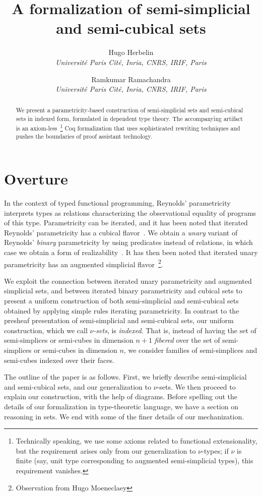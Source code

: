 \documentclass[10pt]{art.cls/art}
\title{A formalization of semi-simplicial and semi-cubical sets}
\author{
  \textcolor{gray80}{Hugo Herbelin} \\
  \itshape \textcolor{gray80}{Université Paris Cité, Inria, CNRS, IRIF, Paris}
  \and
  \textcolor{gray80}{Ramkumar Ramachandra} \\
  \itshape \textcolor{gray80}{Université Paris Cité, Inria, CNRS, IRIF, Paris}
}
\date{}
\begin{document}
\maketitle
\begin{abstract}
  We present a parametricity-based construction of semi-simplicial sets and semi-cubical sets in indexed form, formulated in dependent type theory. The accompanying artifact is an axiom-less~\footnote{Technically speaking, we use some axioms related to functional extensionality, but the requirement arises only from our generalization to $\nu$-types; if $\nu$ is finite (say, unit type corresponding to augmented semi-simplicial types), this requirement vanishes.} Coq formalization that uses sophisticated rewriting techniques and pushes the boundaries of proof assistant technology.
\end{abstract}
\tableofcontents
\newpage

\section{Overture}
In the context of typed functional programming, Reynolds' parametricity~\cite{reynolds72} interprets types as relations characterizing the observational equality of programs of this type. Parametricity can be iterated, and it has been noted that iterated Reynolds' parametricity has a cubical flavor~\cite{johann17,altenkirch15,moulin16}. We obtain a \emph{unary} variant of Reynolds' \emph{binary} parametricity by using predicates instead of relations, in which case we obtain a form of realizability~\cite{bernardy12,moulin16}. It has then been noted that iterated unary parametricity has an augmented simplicial flavor~\footnote{Observation from Hugo Moeneclaey}.

We exploit the connection between iterated unary parametricity and augmented simplicial sets, and between iterated binary parametricity and cubical sets to present a uniform construction of both semi-simplicial and semi-cubical sets obtained by applying simple rules iterating parametricity. In contrast to the presheaf presentation of semi-simplicial and semi-cubical sets, our uniform construction, which we call \emph{$\nu$-sets}, is \emph{indexed}. That is, instead of having the set of semi-simplices or semi-cubes in dimension $n+1$
\emph{fibered} over the set of semi-simplices or semi-cubes in dimension $n$, we consider families of semi-simplices and semi-cubes indexed over their faces.

The outline of the paper is as follows. First, we briefly describe semi-simplicial and semi-cubical sets, and our generalization to $\nu$-sets. We then proceed to explain our construction, with the help of diagrams. Before spelling out the details of our formalization in type-theoretic language, we have a section on reasoning in sets. We end with some of the finer details of our mechanization.
\end{document}
